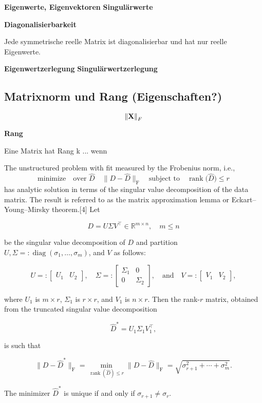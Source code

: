 \textbf{Eigenwerte, Eigenvektoren}
\textbf{Singulärwerte}

\textbf{Diagonalisierbarkeit}
\begin{thm}
Jede symmetrische reelle Matrix ist diagonalisierbar und hat nur reelle Eigenwerte.
\end{thm}
\textbf{Eigenwertzerlegung}
\textbf{Singulärwertzerlegung}

\subsection{Matrixnorm und Rang (Eigenschaften?)}
\begin{defn}[Frobeniusnorm]
$$\left\lVert \mathbf{X} \right\rVert_F$$
\end{defn}

\textbf{Rang}

\begin{defn}[Rang]
Eine Matrix hat Rang k ... wenn
\end{defn}

\begin{thm}
The unstructured problem with fit measured by the Frobenius norm, i.e.,
$$\text{minimize} \quad \text{over } \widehat D \quad \|D - \widehat D\|_{\text{F}} \quad\text{subject to}\quad \operatorname{rank}\big(\widehat D\big) \leq r $$
has analytic solution in terms of the singular value decomposition of the data matrix. The result is referred to as the matrix approximation lemma or Eckart–Young–Mirsky theorem.[4] Let

$$D = U\Sigma V^{\top} \in \mathbb{R}^{m\times n}, \quad m \leq n$$

be the singular value decomposition of $D$ and partition $U, \Sigma=:\operatorname{diag}(\sigma_1,\ldots,\sigma_m)$, and $V$ as follows:

$$U =: \begin{bmatrix} U_1 & U_2\end{bmatrix}, \quad 
\Sigma =: \begin{bmatrix} \Sigma_1 & 0 \\ 0 & \Sigma_2 \end{bmatrix}, \quad\text{and}\quad 
V =: \begin{bmatrix} V_1 & V_2 \end{bmatrix},$$

where $U_{1}$ is $m\times r$, $\Sigma _{1}$ is $r\times r$, and $V_{1}$ is $n\times r$. Then the rank-$r$ matrix, obtained from the truncated singular value decomposition

$$\widehat D^* = U_1 \Sigma_1 V_1^{\top},$$

is such that

$$\|D-\widehat D^*\|_{\text{F}} = \min_{\operatorname{rank}(\widehat D) \leq r} \|D-\widehat D\|_{\text{F}} = \sqrt{\sigma^2_{r+1} + \cdots + \sigma^2_m}.$$

The minimizer $\widehat D^*$ is unique if and only if $\sigma_{r+1}\neq\sigma_{r}$.
\end{thm}

